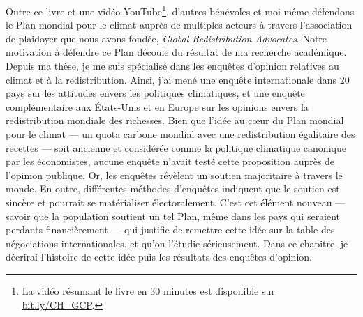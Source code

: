 \documentclass[a5paper,french,openany]{memoir}
\begin{document}
Outre ce livre et une vidéo YouTube\footnote{La vidéo résumant le livre en 30 minutes est disponible sur \href{https://bit.ly/CH_GCP}{bit.ly/CH\_GCP}.}, d'autres bénévoles et moi-même défendons le Plan mondial pour le climat auprès de multiples acteurs à travers l'association de plaidoyer que nous avons fondée, \textit{Global Redistribution Advocates}. %
Notre motivation à défendre ce Plan découle du résultat de ma recherche académique. Depuis ma thèse, je me suis spécialisé dans les enquêtes d'opinion relatives au climat et à la redistribution. Ainsi, j'ai mené une enquête internationale dans 20 pays sur les attitudes envers les politiques climatiques, et une enquête complémentaire aux États-Unis et en Europe sur les opinions envers la redistribution mondiale des richesses. Bien que l'idée au cœur du Plan mondial pour le climat --- un quota carbone mondial avec une redistribution égalitaire des recettes --- soit ancienne et considérée comme la politique climatique canonique par les économistes, aucune enquête n'avait testé cette proposition auprès de l'opinion publique. Or, les enquêtes révèlent un soutien majoritaire à travers le monde. En outre, différentes méthodes d'enquêtes indiquent que le soutien est sincère et pourrait se matérialiser électoralement. 
C'est cet élément nouveau --- savoir que la population soutient un tel Plan, même dans les pays qui seraient perdants financièrement --- qui justifie de remettre cette idée sur la table des négociations internationales, et qu'on l'étudie sérieusement. Dans ce chapitre, je décrirai l'histoire de cette idée puis les résultats des enquêtes d'opinion.

\end{document}

